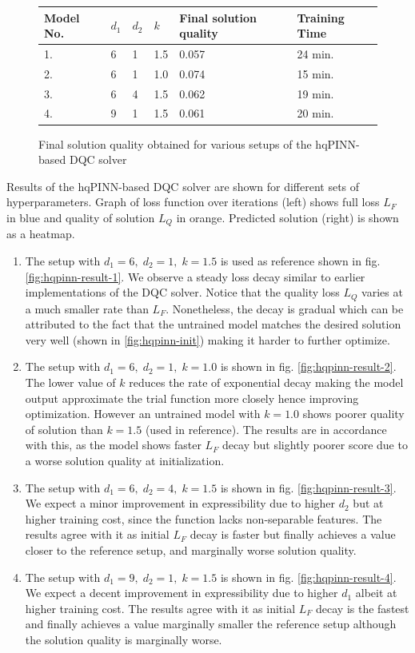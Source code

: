 \documentclass[11pt,a4paper]{article}
\begin{document}
{\begin{figure}[H]
    \centering
    \begin{tabular}{@{}llllll@{}}
        \toprule
        Model No.  & $d_1$ & $d_2$ & $k$ & Final solution quality & Training Time \\ \midrule
        1. & 6 & 1 & 1.5 & 0.057 & 24 min.\\
        2. & 6 & 1 & 1.0 & 0.074 & 15 min.\\
        3. & 6 & 4 & 1.5 & 0.062 & 19 min.\\
        4. & 9 & 1 & 1.5 & 0.061 & 20 min.\\
        \bottomrule
    \end{tabular}
    \caption{Final solution quality obtained for various setups of the hqPINN-based DQC solver}
    \label{fig:hqpinn-result-quality}
\end{figure}


Results of the hqPINN-based DQC solver are shown for different sets of hyperparameters. Graph of loss function over iterations (left) shows full loss $L_F$ in blue and quality of solution $L_Q$ in orange. Predicted solution (right) is shown as a heatmap.\\

\begin{enumerate}
    \item The setup with $d_1=6,\; d_2=1,\; k = 1.5$ is used as reference shown in fig. \ref{fig:hqpinn-result-1}. We observe a steady loss decay similar to earlier implementations of the DQC solver. Notice that the quality loss $L_Q$ varies at a much smaller rate than $L_F$. Nonetheless, the decay is gradual which can be attributed to the fact that the untrained model matches the desired solution very well (shown in \ref{fig:hqpinn-init}) making it harder to further optimize.
    \item The setup with $d_1=6,\; d_2=1,\; k = 1.0$ is shown in fig. \ref{fig:hqpinn-result-2}. The lower value of $k$ reduces the rate of exponential decay making the model output approximate the trial function more closely hence improving optimization. However an untrained model with $k = 1.0$ shows poorer quality of solution than $k = 1.5$ (used in reference). The results are in accordance with this, as the model shows faster $L_F$ decay but slightly poorer score due to a worse solution quality at initialization.
    \item The setup with $d_1=6,\; d_2=4,\; k = 1.5$ is shown in fig. \ref{fig:hqpinn-result-3}. We expect a minor improvement in expressibility due to higher $d_2$ but at higher training cost, since the function lacks non-separable features. The results agree with it as initial $L_F$ decay is faster but finally achieves a value closer to the reference setup, and marginally worse solution quality.
    \item The setup with $d_1=9,\; d_2=1,\; k = 1.5$ is shown in fig. \ref{fig:hqpinn-result-4}. We expect a decent improvement in expressibility due to higher $d_1$ albeit at higher training cost. The results agree with it as initial $L_F$ decay is the fastest and finally achieves a value marginally smaller the reference setup although the solution quality is marginally worse.
\end{enumerate}

}
\end{document}
